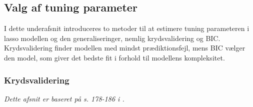 \subsection{Valg af tuning parameter}
I dette underafsnit introduceres to metoder til at estimere tuning parameteren i lasso modellen og den generaliseringer, nemlig krydsvalidering og BIC. 
Krydsvalidering finder modellen med mindst prædiktionsfejl, mens BIC vælger den model, som giver det bedste fit i forhold til modellens kompleksitet. 

\subsubsection{Krydsvalidering}
\textit{Dette afsnit er baseret på s. 178-186 i \citep{james}.}



